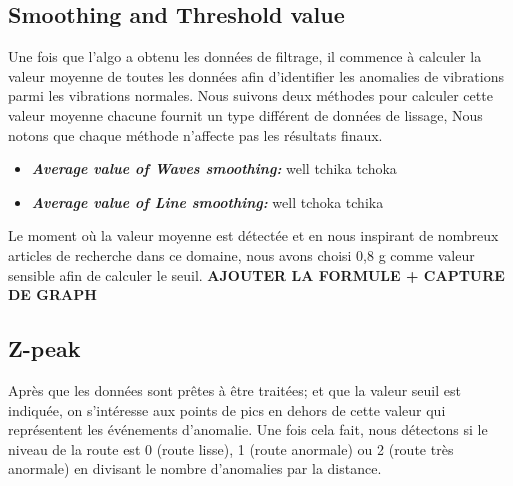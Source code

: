 \subsection{Smoothing and Threshold value}
  Une fois que l'algo a obtenu les données de filtrage, il commence à calculer la valeur moyenne de toutes les données afin d'identifier les anomalies de vibrations parmi les vibrations normales. \newline  
  Nous suivons deux méthodes pour calculer cette valeur moyenne chacune fournit un type différent de données de lissage, Nous notons que chaque méthode n'affecte pas les résultats finaux.
  
  \renewcommand{\labelitemi}{$\bullet$}
    \begin{itemize}
      \item \textbf{\textit{Average value of Waves smoothing:}} well tchika tchoka
      \item \textbf{\textit{Average value of Line smoothing:}} well tchoka tchika
    \end{itemize}
  Le moment où la valeur moyenne est détectée et en nous inspirant de nombreux articles de recherche dans ce domaine, nous avons choisi 0,8 g comme valeur sensible afin de calculer le seuil. \newline
  \textbf{AJOUTER LA FORMULE + CAPTURE DE GRAPH}


\subsection{Z-peak}
Après  que les données sont prêtes à être traitées; et que la valeur seuil est indiquée, on s'intéresse aux points de pics en dehors de cette valeur qui représentent les événements d'anomalie. \newline
Une fois cela fait, nous détectons si le niveau de la route est 0 (route lisse), 1 (route anormale) ou 2 (route très anormale) en divisant le nombre d'anomalies par la distance.